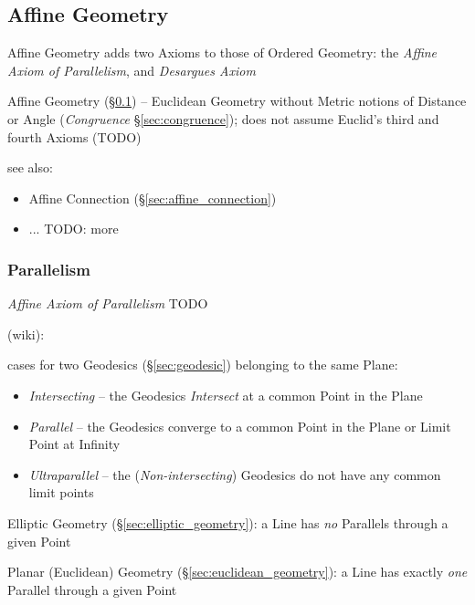 \subsection{Affine Geometry}\label{sec:affine_geometry}

Affine Geometry adds two Axioms to those of Ordered Geometry: the \emph{Affine
  Axiom of Parallelism}, and \emph{Desargues Axiom}

Affine Geometry (\S\ref{sec:affine_geometry}) -- Euclidean Geometry without
Metric notions of Distance or Angle (\emph{Congruence} \S\ref{sec:congruence});
does not assume Euclid's third and fourth Axioms (TODO)

see also:
\begin{itemize}
  \item Affine Connection (\S\ref{sec:affine_connection})
  \item ... TODO: more
\end{itemize}



\subsubsection{Parallelism}\label{sec:parallelism}

\emph{Affine Axiom of Parallelism} TODO

\asterism

(wiki):

cases for two Geodesics (\S\ref{sec:geodesic}) belonging to the same Plane:
\begin{itemize}
  \item \emph{Intersecting} -- the Geodesics \emph{Intersect} at a common Point
    in the Plane
  \item \emph{Parallel} -- the Geodesics converge to a common Point in the Plane
    or Limit Point at Infinity
  \item \emph{Ultraparallel} -- the (\emph{Non-intersecting}) Geodesics do not
    have any common limit points
\end{itemize}

\asterism

\fist Elliptic Geometry (\S\ref{sec:elliptic_geometry}): a Line has \emph{no}
  Parallels through a given Point

\fist Planar (Euclidean) Geometry (\S\ref{sec:euclidean_geometry}): a Line has
  exactly \emph{one} Parallel through a given Point

